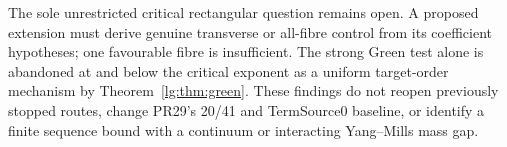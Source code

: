 The sole unrestricted critical rectangular question remains open.
A proposed extension must derive genuine transverse or all-fibre control
from its coefficient hypotheses; one favourable fibre is insufficient.
The strong Green test alone is abandoned at and below the critical
exponent as a uniform target-order mechanism by Theorem~\ref{lg:thm:green}.
These findings do not reopen previously stopped routes, change PR29's
20/41 and TermSource0 baseline, or identify a finite sequence bound with
a continuum or interacting Yang--Mills mass gap.

